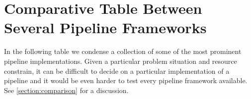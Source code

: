 \documentclass[final,5p,times,twocolumn,authoryear]{elsarticle}
\begin{document}
\onecolumn

\newcommand{\specialcell}[2][c]{%
  \begin{tabular}[#1]{@{}c@{}}#2\end{tabular}}

\section{Comparative Table Between Several Pipeline Frameworks}
\label{appendixb}


In the following table we condense a collection of some of the most prominent pipeline implementations.
%
Given a particular problem situation and resource constrain,
it can be difficult to decide on a particular implementation of a pipeline
and it would be even harder to test every pipeline framework available.
%
See \autoref{section:comparison} for a discussion.
\end{document}
